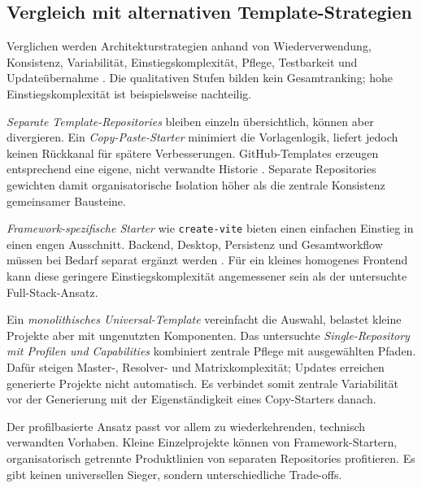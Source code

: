 \subsection{Vergleich mit alternativen Template-Strategien}
\label{subsec:vergleich-template-strategien}

Verglichen werden Architekturstrategien anhand von Wiederverwendung,
Konsistenz, Variabilität, Einstiegskomplexität, Pflege, Testbarkeit und
Updateübernahme
\parencite{krueger1992software-reuse,clements2001software-product-lines}.
Die qualitativen Stufen bilden kein Gesamtranking; hohe Einstiegskomplexität
ist beispielsweise nachteilig.

\emph{Separate Template-Repositories} bleiben einzeln übersichtlich, können
aber divergieren. Ein \emph{Copy-Paste-Starter} minimiert die Vorlagenlogik,
liefert jedoch keinen Rückkanal für spätere Verbesserungen. GitHub-Templates
erzeugen entsprechend eine eigene, nicht verwandte Historie
\parencite{github2026repository-template}.
Separate Repositories gewichten damit organisatorische Isolation höher als die
zentrale Konsistenz gemeinsamer Bausteine.

\emph{Framework-spezifische Starter} wie \texttt{create-vite} bieten einen
einfachen Einstieg in einen engen Ausschnitt. Backend, Desktop, Persistenz und
Gesamtworkflow müssen bei Bedarf separat ergänzt werden
\parencite{vite2026guide}.
Für ein kleines homogenes Frontend kann diese geringere Einstiegskomplexität
angemessener sein als der untersuchte Full-Stack-Ansatz.

Ein \emph{monolithisches Universal-Template} vereinfacht die Auswahl, belastet
kleine Projekte aber mit ungenutzten Komponenten. Das untersuchte
\emph{Single-Repository mit Profilen und Capabilities} kombiniert zentrale
Pflege mit ausgewählten Pfaden. Dafür steigen Master-, Resolver- und
Matrixkomplexität; Updates erreichen generierte Projekte nicht automatisch.
Es verbindet somit zentrale Variabilität vor der Generierung mit der
Eigenständigkeit eines Copy-Starters danach.



Der profilbasierte Ansatz passt vor allem zu wiederkehrenden, technisch
verwandten Vorhaben. Kleine Einzelprojekte können von Framework-Startern,
organisatorisch getrennte Produktlinien von separaten Repositories profitieren.
Es gibt keinen universellen Sieger, sondern unterschiedliche Trade-offs.
